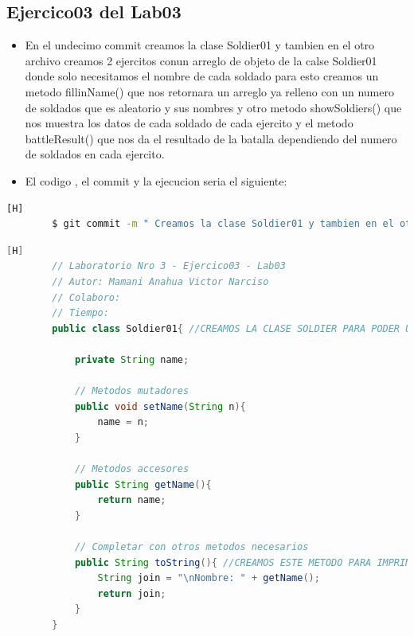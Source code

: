 \documentclass{article}
\begin{document}
	\subsection{Ejercico03 del Lab03}
	\begin{itemize}	
		\item En el undecimo commit creamos la clase Soldier01 y tambien en el otro archivo creamos 2 ejercitos conun arreglo de objeto de la calse Soldier01 donde solo necesitamos el nombre de cada soldado para esto creamos un metodo fillinName() que nos retornara un arreglo ya relleno con un numero de soldados que es aleatorio y sus nombres y otro metodo showSoldiers() que nos muestra los datos de cada soldado de cada ejercito y el metodo battleResult() que nos da el resultado de la batalla dependiendo del numero de soldados en cada ejercito.
		\item El codigo , el commit  y la ejecucion seria el siguiente:
	\end{itemize}
	\begin{lstlisting}[language=bash,caption={Commit}][H]
		$ git commit -m " Creamos la clase Soldier01 y tambien en el otro archivo creamos 2 ejercitos conun arreglo de objeto de la calse Soldier01 donde solo necesitamos el nombre de cada soldado para esto creamos un metodo fillinName() que nos retornara un arreglo ya relleno con un numero de soldados que es aleatorio y sus nombres y otro metodo showSoldiers() que nos muestra los datos de cada soldado de cada ejercito y el metodo battleResult() que nos da el resultado de la batalla dependiendo del numero de soldados en cada jercito"
	\end{lstlisting}
	\begin{lstlisting}[language=java,caption={Las lineas del codigo Soldier01 de lo creado:}][H]
		// Laboratorio Nro 3 - Ejercico03 - Lab03
		// Autor: Mamani Anahua Victor Narciso
		// Colaboro:
		// Tiempo:
		public class Soldier01{ //CREAMOS LA CLASE SOLDIER PARA PODER USAR ARREGLO DE OBJETOS EN LA ACTIVDAD 04 DONDE SE NOS PIDE EL NOMBRE Y LA VIDA DEL SOLDADO  
		
			private String name;
		
			// Metodos mutadores
			public void setName(String n){
				name = n;
			}
		
			// Metodos accesores
			public String getName(){
				return name;
			}
		
			// Completar con otros metodos necesarios
			public String toString(){ //CREAMOS ESTE METODO PARA IMPRIMIR LOS DATOS DEl OBJETO
				String join = "\nNombre: " + getName();
				return join;
			}
		}
	\end{lstlisting}
\end{document}
